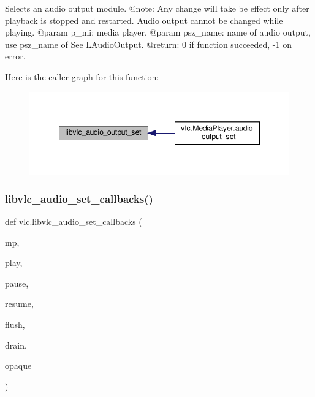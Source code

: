 \begin{DoxyVerb}Selects an audio output module.
@note: Any change will take be effect only after playback is stopped and
restarted. Audio output cannot be changed while playing.
@param p_mi: media player.
@param psz_name: name of audio output, use psz_name of See L{AudioOutput}.
@return: 0 if function succeeded, -1 on error.
\end{DoxyVerb}
 Here is the caller graph for this function\+:
\nopagebreak
\begin{figure}[H]
\begin{center}
\leavevmode
\includegraphics[width=348pt]{namespacevlc_a78552faa46d9cfa68ff163224b9a5c40_icgraph}
\end{center}
\end{figure}
\mbox{\label{namespacevlc_a8edc679f928c8870c5412270fea57b6c}} 
\subsubsection{\texorpdfstring{libvlc\+\_\+audio\+\_\+set\+\_\+callbacks()}{libvlc\_audio\_set\_callbacks()}}
{\footnotesize\ttfamily def vlc.\+libvlc\+\_\+audio\+\_\+set\+\_\+callbacks (\begin{DoxyParamCaption}\item[{}]{mp,  }\item[{}]{play,  }\item[{}]{pause,  }\item[{}]{resume,  }\item[{}]{flush,  }\item[{}]{drain,  }\item[{}]{opaque }\end{DoxyParamCaption})}

